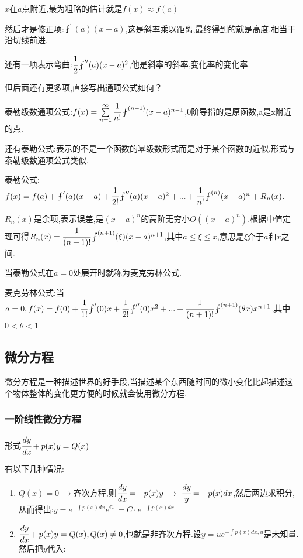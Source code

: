 \documentclass[UTF8,12pt]{ctexbook}
\newcommand{\derivative}{^\prime}
\newcommand{\doubleDerivative}{^{\prime\prime}}
\newcommand{\aLotDerivative}[1]{^{(#1)}}
\newcommand{\upDownSum}[2]{\sum\limits_{#2}^{#1}}
\newcommand{\fDerivative}[1]{\fint\derivative(#1)}
\newcommand{\defFunction}[1]{f(#1)}
\newcommand{\mathConstant}{\mathbb{C}}
\begin{document}
{{{{$x$在$a$点附近,最为粗略的估计就是$\defFunction{x} \approx \defFunction{a}$

然后才是修正项:$\fDerivative{a}(x - a)$,这是斜率乘以距离,最终得到的就是高度.相当于沿切线前进.

还有一项表示弯曲:$\cfrac{1}{2}\fint\doubleDerivative(a)(x - a)^2$,他是斜率的斜率,变化率的变化率.

但后面还有更多项,直接写出通项公式如何？

泰勒级数通项公式:$\defFunction{x} = \upDownSum{\infty}{n = 1}\cfrac{1}{n!}\fint\aLotDerivative{n - 1}(x - a)^{n - 1}$,0阶导指的是原函数,a是x附近的点.

还有泰勒公式:表示的不是一个函数的幂级数形式而是对于某个函数的近似,形式与泰勒级数通项公式类似.

泰勒公式:$\defFunction{x} = \defFunction{a} + \fDerivative{a}(x - a) + \cfrac{1}{2!}\fint\doubleDerivative(a)(x - a)^2 + ... + \cfrac{1}{n!}\fint\aLotDerivative{n}(x - a)^n + R_n(x)$.

$R_n(x)$是余项,表示误差,是$(x - a)^n$的高阶无穷小$O((x - a)^n)$.根据中值定理可得$R_n(x) = \cfrac{1}{(n + 1)!}\fint\aLotDerivative{n + 1}(\xi)(x - a)^{n+1}$,其中$a \leq \xi \leq x$,意思是$\xi$介于$a$和$x$之间.

当泰勒公式在$a = 0$处展开时就称为麦克劳林公式.

麦克劳林公式:当$a = 0, \defFunction{x} = \defFunction{0} + \cfrac{1}{1!}\fDerivative{0}x + \cfrac{1}{2!}\fint\doubleDerivative(0)x^2 + ... + \cfrac{1}{(n + 1)!}\fint\aLotDerivative{n + 1}(\theta x)x^{n+1}$,其中$0 < \theta < 1$

}%

}%

\subsection{微分方程}{
微分方程是一种描述世界的好手段,当描述某个东西随时间的微小变化比起描述这个物体整体的变化更方便的时候就会使用微分方程.

\subsubsection{一阶线性微分方程}{
  形式$\cfrac{dy}{dx} + p(x)y = Q(x)$

  有以下几种情况:
  \begin{enumerate}
    \item $Q(x) = 0\ \to$齐次方程,则$\cfrac{dy}{dx} = -p(x)y\ \to \ \cfrac{dy}{y} = -p(x)dx$,然后两边求积分,从而得出:$y = e^{-\int p(x)dx}e^{\mathConstant_1} = C \cdot e^{-\int p(x)dx}$
    \item {
          $\cfrac{dy}{dx} + p(x)y = Q(x), Q(x) \neq 0$,也就是非齐次方程.设$y = ue^{-\int p(x)dx, u}$是未知量.然后把$y$代入:

}
\end{enumerate}}}}}
\end{document}
